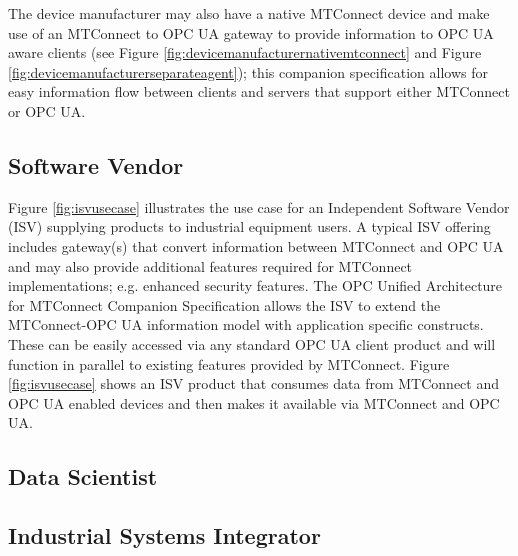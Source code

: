 The device manufacturer may also have a native MTConnect device and make use of an MTConnect to OPC UA gateway to provide  information to OPC UA aware clients (see Figure \ref{fig:devicemanufacturernativemtconnect} and Figure \ref{fig:devicemanufacturerseparateagent}); this companion specification allows for easy information flow between clients and servers that support either MTConnect or OPC UA.





\FloatBarrier

\subsection{Software Vendor}

Figure \ref{fig:isvusecase} illustrates the use case for an Independent Software Vendor (ISV) supplying products to industrial equipment users. A typical ISV offering includes gateway(s) that convert information between MTConnect and OPC UA and may also provide additional features required for MTConnect implementations; e.g. enhanced security features. The OPC Unified Architecture for MTConnect Companion Specification allows the ISV to extend the MTConnect-OPC UA information model with application specific constructs. These can be easily accessed via any standard OPC UA client product and will function in parallel to existing features provided by MTConnect. Figure \ref{fig:isvusecase} shows an ISV product that consumes data from MTConnect and OPC UA enabled devices and then makes it available via MTConnect and OPC UA.


\FloatBarrier

\subsection{Data Scientist}

\FloatBarrier

\subsection{Industrial Systems Integrator}

\FloatBarrier
